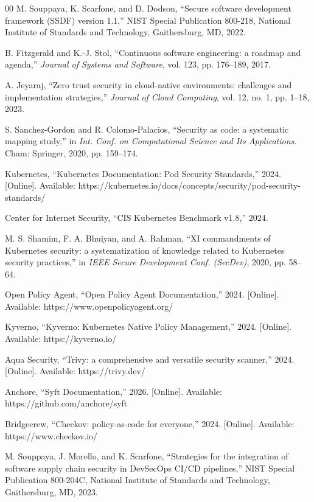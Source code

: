 \documentclass[conference]{IEEEtran}
\begin{document}
\begin{thebibliography}{00}
 M. Souppaya, K. Scarfone, and D. Dodson, ``Secure software development framework (SSDF) version 1.1,'' NIST Special Publication 800-218, National Institute of Standards and Technology, Gaithersburg, MD, 2022.

 B. Fitzgerald and K.-J. Stol, ``Continuous software engineering: a roadmap and agenda,'' \emph{Journal of Systems and Software}, vol. 123, pp. 176--189, 2017.

 A. Jeyaraj, ``Zero trust security in cloud-native environments: challenges and implementation strategies,'' \emph{Journal of Cloud Computing}, vol. 12, no. 1, pp. 1--18, 2023.

 S. Sanchez-Gordon and R. Colomo-Palacios, ``Security as code: a systematic mapping study,'' in \emph{Int. Conf. on Computational Science and Its Applications}. Cham: Springer, 2020, pp. 159--174.

 Kubernetes, ``Kubernetes Documentation: Pod Security Standards,'' 2024. [Online]. Available: https://kubernetes.io/docs/concepts/security/pod-security-standards/

 Center for Internet Security, ``CIS Kubernetes Benchmark v1.8,'' 2024.

 M. S. Shamim, F. A. Bhuiyan, and A. Rahman, ``XI commandments of Kubernetes security: a systematization of knowledge related to Kubernetes security practices,'' in \emph{IEEE Secure Development Conf. (SecDev)}, 2020, pp. 58--64.

 Open Policy Agent, ``Open Policy Agent Documentation,'' 2024. [Online]. Available: https://www.openpolicyagent.org/

 Kyverno, ``Kyverno: Kubernetes Native Policy Management,'' 2024. [Online]. Available: https://kyverno.io/

 Aqua Security, ``Trivy: a comprehensive and versatile security scanner,'' 2024. [Online]. Available: https://trivy.dev/

 Anchore, ``Syft Documentation,'' 2026. [Online]. Available: https://github.com/anchore/syft

 Bridgecrew, ``Checkov: policy-as-code for everyone,'' 2024. [Online]. Available: https://www.checkov.io/

 M. Souppaya, J. Morello, and K. Scarfone, ``Strategies for the integration of software supply chain security in DevSecOps CI/CD pipelines,'' NIST Special Publication 800-204C, National Institute of Standards and Technology, Gaithersburg, MD, 2023.


\end{thebibliography}
\end{document}
